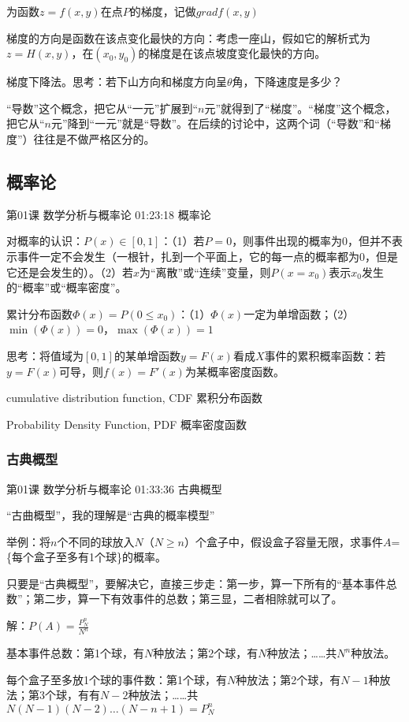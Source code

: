 \documentclass[UTF8]{ctexbook}
\begin{document}
为函数$z=f(x,y)$在点$P$的梯度，记做$gradf(x,y)$

梯度的方向是函数在该点变化最快的方向：考虑一座山，假如它的解析式为$z=H(x,y)$，在$(x_{0},y_{0})$的梯度是在该点坡度变化最快的方向。

梯度下降法。思考：若下山方向和梯度方向呈$\theta$角，下降速度是多少？

“导数”这个概念，把它从“一元”扩展到“$n$元”就得到了“梯度”。“梯度”这个概念，把它从“$n$元”降到“一元”就是“导数”。在后续的讨论中，这两个词（“导数”和“梯度”）往往是不做严格区分的。

\subsection{概率论}

第01课 数学分析与概率论 01:23:18 概率论

对概率的认识：$P(x) \in [0,1]$：（1）若$P=0$，则事件出现的概率为0，但并不表示事件一定不会发生（一根针，扎到一个平面上，它的每一点的概率都为0，但是它还是会发生的）。（2）若$x$为“离散”或“连续”变量，则$P(x=x_{0})$表示$x_{0}$发生的“概率”或“概率密度”。

累计分布函数$\Phi (x) = P(0 \leq x_{0})$：（1）$\Phi (x)$一定为单增函数；（2）$\min (\Phi (x))=0$，$\max (\Phi (x))=1$

思考：将值域为$[0,1]$的某单增函数$y=F(x)$看成$X$事件的累积概率函数：若$y=F(x)$可导，则$f(x)=F'(x)$为某概率密度函数。

cumulative distribution function, CDF 累积分布函数

Probability Density Function, PDF 概率密度函数

\subsubsection{古典概型}

第01课 数学分析与概率论 01:33:36 古典概型

“古曲概型”，我的理解是“古典的概率模型”

举例：将$n$个不同的球放入$N$（$N \geq n$）个盒子中，假设盒子容量无限，求事件$A$=\{每个盒子至多有1个球\}的概率。

只要是“古典概型”，要解决它，直接三步走：第一步，算一下所有的“基本事件总数”；第二步，算一下有效事件的总数；第三显，二者相除就可以了。

解：$P(A)=\frac{P_{N}^{n}}{N^{n}}$

基本事件总数：第1个球，有$N$种放法；第2个球，有$N$种放法；……共$N^{n}$种放法。

每个盒子至多放1个球的事件数：第1个球，有$N$种放法；第2个球，有$N-1$种放法；第3个球，有有$N-2$种放法；……共$N(N-1)(N-2)\dots(N-n+1)=P_{N}^{n}$
\end{document}
